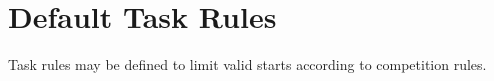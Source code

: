 \documentclass[a4paper,12pt]{refrep}
\begin{document}



\clearpage
\section{Default Task Rules}
Task rules may be defined to limit valid starts according to competition
rules.
\end{document}
